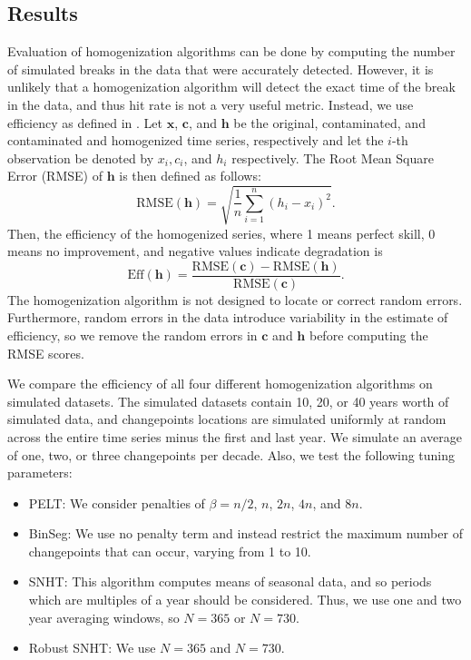 \documentclass[12pt]{article}
\begin{document}
\begin{doublespacing}
\subsection{Results}

\label{sec:HomResults}

Evaluation of homogenization algorithms can be done by computing the number of simulated breaks in the data that were accurately detected.  However, it is unlikely that a homogenization algorithm will detect the exact time of the break in the data, and thus hit rate is not a very useful metric.  Instead, we use efficiency as defined in \cite{domonkos13}.  Let $\mathbf{x}$, $\mathbf{c}$, and $\mathbf{h}$ be the original, contaminated, and contaminated and homogenized time series, respectively and let the $i$-th observation be denoted by $x_i, c_i$, and $h_i$ respectively.  The Root Mean Square Error (RMSE) of $\mathbf{h}$ is then defined as follows:
\begin{equation*}
	\mbox{RMSE}(\mathbf{h}) = \sqrt{\frac{1}{n} \sum_{i=1}^n (h_i-x_i)^2}.
\end{equation*}
Then, the efficiency of the homogenized series, where 1 means perfect skill, 0 means no improvement, and negative values indicate degradation is
\begin{equation*}
	\mbox{Eff}(\mathbf{h}) = \frac{\mbox{RMSE}(\mathbf{c})-\mbox{RMSE}(\mathbf{h})}{\mbox{RMSE}(\mathbf{c})}.
\end{equation*}
The homogenization algorithm is not designed to locate or correct random errors.  Furthermore, random errors in the data introduce variability in the estimate of efficiency, so we remove the random errors in $\mathbf{c}$ and $\mathbf{h}$ before computing the RMSE scores.  

We compare the efficiency of all four different homogenization algorithms on simulated datasets.  The simulated datasets contain 10, 20, or 40 years worth of simulated data, and changepoints locations are simulated uniformly at random across the entire time series minus the first and last year.  We simulate an average of one, two, or three changepoints per decade.  Also, we test the following tuning parameters:

\begin{itemize}
	\item PELT: We consider penalties of $\beta=n/2$, $n$, $2n$, $4n$, and  $8n$.
	\item BinSeg: We use no penalty term and instead restrict the maximum number of changepoints that can occur, varying from 1 to 10.
	\item SNHT: This algorithm computes means of seasonal data, and so periods which are multiples of a year should be considered.  Thus, we use one and two year averaging windows, so $N=365$ or $N=730$.
	\item Robust SNHT: We  use $N=365$ and $N= 730$.
\end{itemize}


\end{doublespacing}
\end{document}
